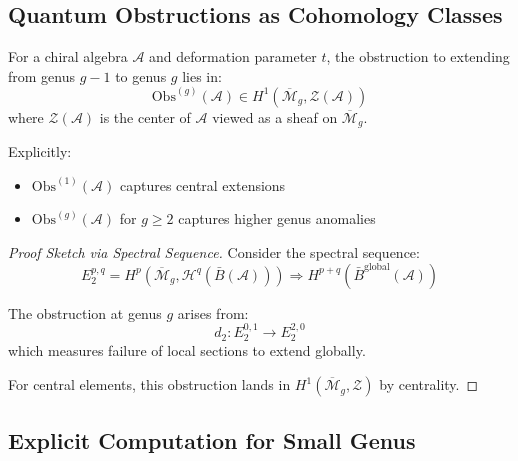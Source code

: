 \subsection{Quantum Obstructions as Cohomology Classes}

\begin{theorem}
\label{thm:obstruction-quantum}
For a chiral algebra $\mathcal{A}$ and deformation parameter $t$, the obstruction to extending from genus $g-1$ to genus $g$ lies in:
\begin{equation}
\text{Obs}^{(g)}(\mathcal{A}) \in H^1(\overline{\mathcal{M}}_g, \mathcal{Z}(\mathcal{A}))
\end{equation}
where $\mathcal{Z}(\mathcal{A})$ is the center of $\mathcal{A}$ viewed as a sheaf on $\overline{\mathcal{M}}_g$.

Explicitly:
\begin{itemize}
\item $\text{Obs}^{(1)}(\mathcal{A})$ captures central extensions
\item $\text{Obs}^{(g)}(\mathcal{A})$ for $g \geq 2$ captures higher genus anomalies
\end{itemize}
\end{theorem}

\begin{proof}[Proof Sketch via Spectral Sequence]
Consider the spectral sequence:
\begin{equation}
E_2^{p,q} = H^p(\overline{\mathcal{M}}_g, \mathcal{H}^q(\bar{B}(\mathcal{A}))) \Rightarrow H^{p+q}(\bar{B}^{\text{global}}(\mathcal{A}))
\end{equation}

The obstruction at genus $g$ arises from:
\begin{equation}
d_2: E_2^{0,1} \to E_2^{2,0}
\end{equation}
which measures failure of local sections to extend globally.

For central elements, this obstruction lands in $H^1(\overline{\mathcal{M}}_g, \mathcal{Z})$ by centrality.
\end{proof}

\subsection{Explicit Computation for Small Genus}

